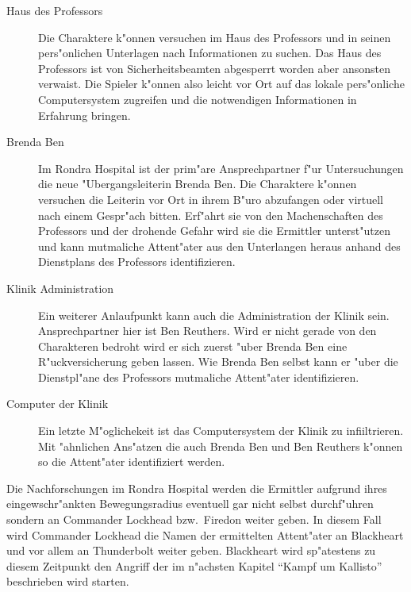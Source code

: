  \begin{description}
	\item [Haus des Professors] Die Charaktere k"onnen versuchen im Haus des Professors und in seinen pers"onlichen Unterlagen nach 
		Informationen zu suchen. Das Haus des Professors ist von Sicherheitsbeamten abgesperrt worden aber ansonsten verwaist. Die Spieler k"onnen also leicht vor Ort auf das lokale pers"onliche Computersystem zugreifen und die notwendigen Informationen in Erfahrung bringen.
	\item [Brenda Ben] Im Rondra Hospital ist der prim"are Ansprechpartner f"ur Untersuchungen die neue "Ubergangsleiterin Brenda Ben. 
		Die Charaktere k"onnen versuchen die Leiterin vor Ort in ihrem B"uro abzufangen oder virtuell nach einem Gespr"ach bitten. Erf"ahrt sie von den Machenschaften des Professors und der drohende Gefahr wird sie die Ermittler unterst"utzen und kann mutma\3liche Attent"ater aus den Unterlangen heraus anhand des Dienstplans des Professors identifizieren.
	\item [Klinik Administration] Ein weiterer Anlaufpunkt kann auch die Administration der Klinik sein. Ansprechpartner hier ist Ben 
		Reuthers. Wird er nicht gerade von den Charakteren bedroht wird er sich zuerst "uber Brenda Ben eine R"uckversicherung geben lassen. Wie Brenda Ben selbst kann er "uber die Dienstpl"ane des Professors mutma\3liche Attent"ater identifizieren.
	\item [Computer der Klinik] Ein letzte M"oglichekeit ist das Computersystem der Klinik zu infiiltrieren. Mit "ahnlichen Ans"atzen 
		die auch Brenda Ben und Ben Reuthers k"onnen so die Attent"ater identifiziert werden.
 \end{description}

 Die Nachforschungen im Rondra Hospital werden die Ermittler aufgrund ihres eingewschr"ankten Bewegungsradius eventuell gar nicht selbst durchf"uhren sondern an Commander Lockhead bzw.~Firedon weiter geben. In diesem Fall wird Commander Lockhead die Namen der ermittelten Attent"ater an Blackheart und vor allem an Thunderbolt weiter geben. Blackheart wird sp"atestens zu diesem Zeitpunkt den Angriff der im n"achsten Kapitel "`Kampf um Kallisto"' beschrieben wird starten.
 

